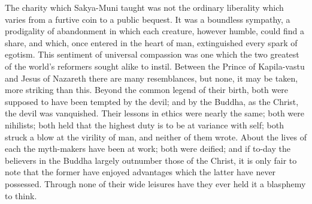 \documentclass[]{book}
\begin{document}
The charity which Sakya-Muni taught was not the ordinary liberality
which varies from a furtive coin to a public bequest. It was a boundless
sympathy, a prodigality of abandonment in which each creature, however
humble, could find a share, and which, once entered in the heart of man,
extinguished every spark of egotism. This sentiment of universal
compassion was one which the two greatest of the world's reformers
sought alike to instil. Between the Prince of Kapila-vastu and Jesus of
Nazareth there are many resemblances, but none, it may be taken, more
striking than this. Beyond the common legend of their birth, both were
supposed to have been tempted by the devil; and by the Buddha, as the
Christ, the devil was vanquished. Their lessons in ethics were nearly
the same; both were nihilists; both held that the highest duty is to be
at variance with self; both struck a blow at the virility of man, and
neither of them wrote. About the lives of each the myth-makers have been
at work; both were deified; and if to-day the believers in the Buddha
largely outnumber those of the Christ, it is only fair to note that the
former have enjoyed advantages which the latter have never possessed.
Through none of their wide leisures have they ever held it a blasphemy
to think.
\end{document}
